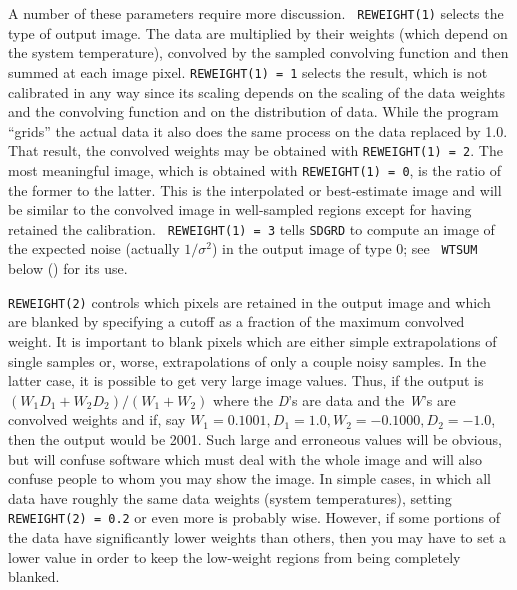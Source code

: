      A number of these parameters require more discussion.  {\tt
REWEIGHT(1)} selects the type of output image.  The data are
multiplied by their weights (which depend on the system temperature),
convolved by the sampled convolving function and then summed at each
image pixel.  {\tt REWEIGHT(1) = 1} selects the result, which is not
calibrated in any way since its scaling depends on the scaling of the
data weights and the convolving function and on the distribution of
data.  While the program ``grids'' the actual data it also does the
same process on the data replaced by 1.0.  That result, the convolved
weights may be obtained with {\tt REWEIGHT(1) = 2}.  The most
meaningful image, which is obtained with {\tt REWEIGHT(1) = 0}, is the
ratio of the former to the latter.  This is the interpolated or
best-estimate image and will be similar to the convolved image in
well-sampled regions except for having retained the calibration.  {\tt
REWEIGHT(1) = 3} tells {\tt SDGRD} to compute an image of the expected
noise (actually $1 / \sigma^2$) in the output image of type 0; see {\tt
WTSUM} below () for its use.

     {\tt REWEIGHT(2)} controls which pixels are retained in the
output image and which are blanked by specifying a cutoff as a
fraction of the maximum convolved weight.  It is important to blank
pixels which are either simple extrapolations of single samples or,
worse, extrapolations of only a couple noisy samples.  In the latter
case, it is possible to get very large image values. Thus, if the
output is $(W_1D_1 + W_2D_2) / (W_1 + W_2)$ where the {\it D\/}'s are
data and the {\it W\/}'s are convolved weights and if, say $W_1 =
0.1001, D_1 = 1.0, W_2 = -0.1000, D_2 = -1.0$, then the output would
be 2001.  Such large and erroneous values will be obvious, but will
confuse software which must deal with the whole image and will also
confuse people to whom you may show the image.  In simple cases, in
which all data have roughly the same data weights (system
temperatures), setting {\tt REWEIGHT(2) = 0.2} or even more is
probably wise.  However, if some portions of the data have
significantly lower weights than others, then you may have to set a
lower value in order to keep the low-weight regions from being
completely blanked.

